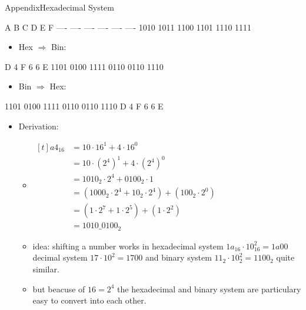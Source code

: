 \begin{frame}{Appendix}{Hexadecimal System}
\begin{terminal}
  A    B    C    D    E    F
  ---- ---- ---- ---- ---- ----
  1010 1011 1100 1101 1110 1111
  \end{terminal}
  \framebreak
  \begin{itemize}
    \item \alert{Hex $\Rightarrow$ Bin:}
  \end{itemize}
  \begin{terminal}
     D    4    F    6    6    E
  1101 0100 1111 0110 0110 1110
  \end{terminal}
  \begin{itemize}
    \item \alert{Bin $\Rightarrow$ Hex:}
  \end{itemize}
  \begin{terminal}
  1101 0100 1111 0110 0110 1110
     D    4    F    6    6    E
  \end{terminal}
  \framebreak
  \begin{itemize}
    \item \alert{Derivation:}
    \begin{itemize}
      \item $\begin{aligned}[t]
          a4_{16} &= 10 \cdot 16^1 + 4 \cdot 16^0 \\
                  &= 10 \cdot {(2^4)}^1 + 4 \cdot {(2^4)}^0 \\
                  &= 1010_2 \cdot 2^4 + 0100_2 \cdot 1 \\
                  &= (1000_2 \cdot 2^4 + 10_2 \cdot 2^4) + (100_2 \cdot 2^0) \\
                  &= (1 \cdot 2^7 + 1 \cdot 2^5) + (1 \cdot 2^2) \\
                  &= 1010\_0100_{2}
        \end{aligned}$
      \item \alert{idea:} shifting a number works in hexadecimal system $1a_{16} \cdot 10^2_{16} = 1a00$ decimal system $17 \cdot 10^2 = 1700$ and binary system $11_2 \cdot 10_2^2 = 1100_2$ quite similar.
      \item but beacuse of $16 = 2^4$ the \alert{hexadecimal} and \alert{binary system} are particulary easy to convert into each other.
    \end{itemize}
  \end{itemize}
\end{frame}
